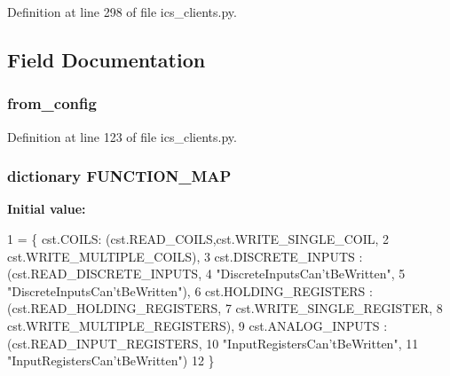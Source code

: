 Definition at line 298 of file ics\+\_\+clients.\+py.



\subsection{Field Documentation}
\subsubsection[{from\+\_\+config}]{\setlength{\rightskip}{0pt plus 5cm}from\+\_\+config}\label{classprotolibs_1_1ics__clients_1_1_modbus_client_a0836af62ebe86a37c473ce7c7c75624c}


Definition at line 123 of file ics\+\_\+clients.\+py.

\subsubsection[{F\+U\+N\+C\+T\+I\+O\+N\+\_\+\+M\+A\+P}]{\setlength{\rightskip}{0pt plus 5cm}dictionary F\+U\+N\+C\+T\+I\+O\+N\+\_\+\+M\+A\+P\hspace{0.3cm}{\ttfamily [static]}}\label{classprotolibs_1_1ics__clients_1_1_modbus_client_a8c97173af426b6c1d7c0336732413a3c}
{\bfseries Initial value\+:}
\begin{DoxyCode}
1 = \{ cst.COILS: (cst.READ\_COILS,cst.WRITE\_SINGLE\_COIL, 
2                                                 cst.WRITE\_MULTIPLE\_COILS),
3                       cst.DISCRETE\_INPUTS : (cst.READ\_DISCRETE\_INPUTS, 
4                                                 \textcolor{stringliteral}{"DiscreteInputsCan'tBeWritten"},
5                                                 \textcolor{stringliteral}{"DiscreteInputsCan'tBeWritten"}),
6                       cst.HOLDING\_REGISTERS : (cst.READ\_HOLDING\_REGISTERS, 
7                                                 cst.WRITE\_SINGLE\_REGISTER, 
8                                                cst.WRITE\_MULTIPLE\_REGISTERS),
9                       cst.ANALOG\_INPUTS : (cst.READ\_INPUT\_REGISTERS, 
10                                                 \textcolor{stringliteral}{"InputRegistersCan'tBeWritten"},
11                                                 \textcolor{stringliteral}{"InputRegistersCan'tBeWritten"}) 
12                    \}
\end{DoxyCode}


